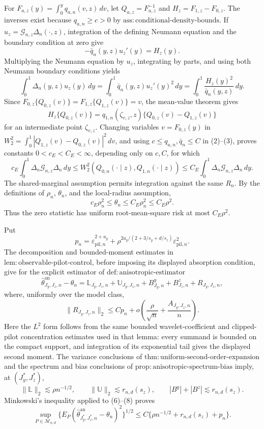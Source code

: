 For \(F_{a,z}(y)=\int_0^yq_{a,n}(v,z)\,dv\), let \(Q_{a,z}=F_{a,z}^{-1}\) and \(H_z=F_{1,z}-F_{0,z}\). The inverses exist because \(q_{a,n}\ge c>0\) by \(\mathrm{ass{:}conditional\text{-}density\text{-}bounds}\). If \(u_z=\mathcal G_{n,z}\Delta_n(\cdot,z)\), integration of the defining Neumann equation and the boundary condition at zero give
\[
-\bar q_n(y,z)u_z'(y)=H_z(y).                                      \tag{1}
\]
Multiplying the Neumann equation by \(u_z\), integrating by parts, and using both Neumann boundary conditions yields
\[
\int_0^1\Delta_n(y,z)u_z(y)\,dy
=\int_0^1\bar q_n(y,z)u_z'(y)^2\,dy
=\int_0^1\frac{H_z(y)^2}{\bar q_n(y,z)}\,dy.                       \tag{2}
\]
Since \(F_{0,z}\{Q_{0,z}(v)\}=F_{1,z}\{Q_{1,z}(v)\}=v\), the mean-value theorem gives
\[
H_z\{Q_{0,z}(v)\}
=q_{1,n}(\zeta_{v,z},z)\{Q_{0,z}(v)-Q_{1,z}(v)\}                 \tag{3}
\]
for an intermediate point \(\zeta_{v,z}\). Changing variables \(v=F_{0,z}(y)\) in \(W_2^2=\int_0^1|Q_{1,z}(v)-Q_{0,z}(v)|^2\,dv\), and using \(c\le q_{a,n},\bar q_n\le C\) in (2)--(3), proves constants \(0<c_E<C_E<\infty\), depending only on \(c,C\), for which
\[
c_E\int_0^1\Delta_n\mathcal G_{n,z}\Delta_n\,dy
\le W_2^2(Q_{0,n}(\cdot\mid z),Q_{1,n}(\cdot\mid z))
\le C_E\int_0^1\Delta_n\mathcal G_{n,z}\Delta_n\,dy.            \tag{4}
\]
The shared-marginal assumption permits integration against the same \(R_n\). By the definitions of \(\rho_n\), \(\theta_n\), and the local-radius assumption,
\[
c_E\rho_n^2\le\theta_n\le C_E\rho_n^2\le C_E\rho^2.             \tag{5}
\]
Thus the zero statistic has uniform root-mean-square risk at most \(C_E\rho^2\).

Put
\[
p_n=\varepsilon_{\mathrm{pil},n}^{2+a_y}
+\rho^{2a_y/(2+3/s_y+d/s_z)}\varepsilon_{\mathrm{pil},n}^2.
\]
The decomposition and bounded-moment estimates in \(\mathrm{lem{:}observable\text{-}pilot\text{-}control}\), before imposing its displayed absorption condition, give for the explicit estimator of \(\mathrm{def{:}anisotropic\text{-}estimator}\)
\[
\widehat\theta^{\mathrm{an}}_{J_y,J_z,n}-\theta_n
=\mathbb L_{J_y,J_z,n}+\mathbb U_{J_y,J_z,n}
+B^y_{J_y,n}+B^z_{J_z,n}+R_{J_y,J_z,n},                            \tag{6}
\]
where, uniformly over the model class,
\[
\|R_{J_y,J_z,n}\|_2\le C p_n+o\!\left(\frac{\rho}{\sqrt n}+\frac{A_{J_y,J_z,n}}n\right). \tag{7}
\]
Here the \(L^2\) form follows from the same bounded wavelet-coefficient and clipped-pilot concentration estimates used in that lemma: every summand is bounded on the compact support, and integration of its exponential tail gives the displayed second moment. The variance conclusions of \(\mathrm{thm{:}uniform\text{-}second\text{-}order\text{-}expansion}\) and the spectrum and bias conclusions of \(\mathrm{prop{:}anisotropic\text{-}spectrum\text{-}bias}\) imply, at \((J_y^*,J_z^*)\),
\[
\|\mathbb L\|_2\lesssim\rho n^{-1/2},\qquad
\|\mathbb U\|_2\lesssim r_{n,d}(s_z),\qquad
|B^y|+|B^z|\lesssim r_{n,d}(s_z).                                  \tag{8}
\]
Minkowski's inequality applied to (6)--(8) proves
\[
\sup_{P\in\mathcal M_{n,d}}
\{E_P(\widehat\theta^{\mathrm{an}}_{J_y^*,J_z^*,n}-\theta_n)^2\}^{1/2}
\le C\{\rho n^{-1/2}+r_{n,d}(s_z)+p_n\}.                         \tag{9}
\]

